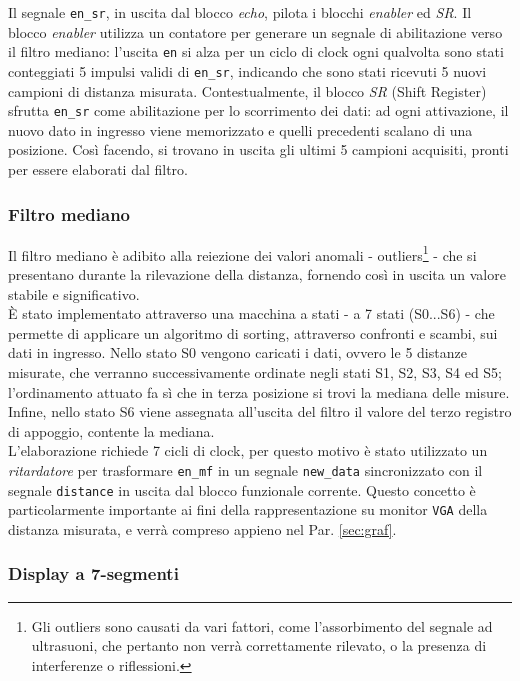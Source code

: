 \documentclass[reprint,amsmath,amssymb,aps,rmp,twoside]{revtex4-2}
\begin{document}
Il segnale \texttt{en\_sr}, in uscita dal blocco \textit{echo}, pilota i blocchi \textit{enabler} ed \textit{SR}. Il blocco \textit{enabler} utilizza un contatore per generare un segnale di abilitazione verso il filtro mediano: l'uscita \texttt{en} si alza per un ciclo di clock ogni qualvolta sono stati conteggiati 5 impulsi validi di \texttt{en\_sr}, indicando che sono stati ricevuti 5 nuovi campioni di distanza misurata. Contestualmente, il blocco \textit{SR} (Shift Register) sfrutta \texttt{en\_sr} come abilitazione per lo scorrimento dei dati: ad ogni attivazione, il nuovo dato in ingresso viene memorizzato e quelli precedenti scalano di una posizione. Così facendo, si trovano in uscita gli ultimi 5 campioni acquisiti, pronti per essere elaborati dal filtro.

\subsubsection{Filtro mediano}

Il filtro mediano è adibito alla reiezione dei valori anomali - outliers\footnote{Gli outliers sono causati da vari fattori, come l'assorbimento del segnale ad ultrasuoni, che pertanto non verrà correttamente rilevato, o la presenza di interferenze o riflessioni.} - che si presentano durante la rilevazione della distanza, fornendo così in uscita un valore stabile e significativo.\\ 
\`E stato implementato attraverso una macchina a stati - a 7 stati (S0...S6) - che permette di applicare un algoritmo di sorting, attraverso confronti e scambi, sui dati in ingresso. Nello stato S0 vengono caricati i dati, ovvero le 5 distanze misurate, che verranno successivamente ordinate negli stati S1, S2, S3, S4 ed S5; l'ordinamento attuato fa sì che in terza posizione si trovi la mediana delle misure. Infine, nello stato S6 viene assegnata all'uscita del filtro  il valore del terzo registro di appoggio, contente la mediana.\\
L'elaborazione richiede 7 cicli di clock, per questo motivo è stato utilizzato un \textit{ritardatore} per trasformare \texttt{en\_mf} in un segnale \texttt{new\_data} sincronizzato con il segnale \texttt{distance} in uscita dal blocco funzionale corrente. Questo concetto è particolarmente importante ai fini della rappresentazione su monitor \texttt{VGA} della distanza misurata, e verrà compreso appieno nel Par. \ref{sec:graf}.

\subsubsection{Display a 7-segmenti}
\end{document}
